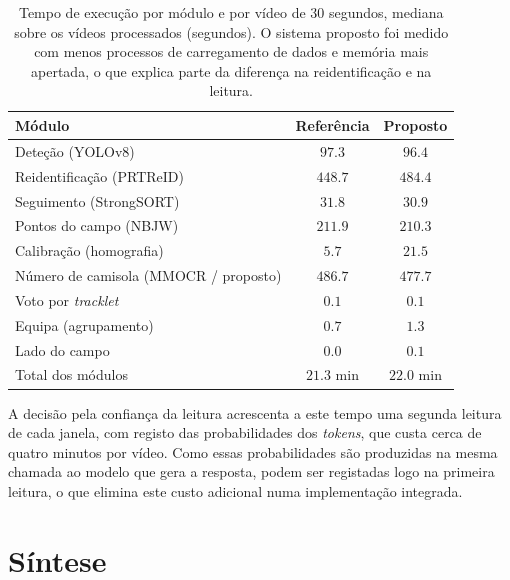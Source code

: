 \begin{table}[htbp]
    \centering
    \caption{Tempo de execução por módulo e por vídeo de $30$ segundos, mediana sobre os vídeos
    processados (segundos). O sistema proposto foi medido com menos processos de carregamento de
    dados e memória mais apertada, o que explica parte da diferença na reidentificação e na leitura.}
    \label{tab:tempos}
    \begin{tabular}{|l|c|c|}
        \hline
        \textbf{Módulo} & \textbf{Referência} & \textbf{Proposto} \\
        \hline
        Deteção (YOLOv8)                          & $97.3$  & $96.4$ \\
        \hline
        Reidentificação (PRTReID)                 & $448.7$ & $484.4$ \\
        \hline
        Seguimento (StrongSORT)                   & $31.8$  & $30.9$ \\
        \hline
        Pontos do campo (NBJW)                    & $211.9$ & $210.3$ \\
        \hline
        Calibração (homografia)                   & $5.7$   & $21.5$ \\
        \hline
        Número de camisola (MMOCR / proposto)     & $486.7$ & $477.7$ \\
        \hline
        Voto por \emph{tracklet}                  & $0.1$   & $0.1$ \\
        \hline
        Equipa (agrupamento)                      & $0.7$   & $1.3$ \\
        \hline
        Lado do campo                             & $0.0$   & $0.1$ \\
        \hline
        Total dos módulos                         & $21.3$ min & $22.0$ min \\
        \hline
    \end{tabular}
\end{table}

A decisão pela confiança da leitura acrescenta a este tempo uma segunda leitura de cada janela, com
registo das probabilidades dos \emph{tokens}, que custa cerca de quatro minutos por vídeo. Como essas
probabilidades são produzidas na mesma chamada ao modelo que gera a resposta, podem ser registadas
logo na primeira leitura, o que elimina este custo adicional numa implementação integrada.

\section{Síntese}\label{sec:res_sintese}

